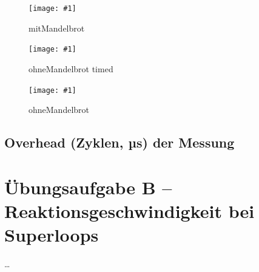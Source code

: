 \documentclass{article}
\newcommand{\bild}[3]{\begin{figure}[h!]		\begin{center}			\texttt{[image: \#1]}			\caption{#2}		\end{center}	\end{figure}}
\begin{document}
\bild{02_mitMandelbrot}{mitMandelbrot}{width=\textwidth}
\bild{03_ohneMandelbrot_time}{ohneMandelbrot timed}{width=\textwidth}
\bild{03_ohneMandelbrot}{ohneMandelbrot}{width=\textwidth}

\subsection{Overhead (Zyklen, µs) der Messung}

\section{Übungsaufgabe B – Reaktionsgeschwindigkeit bei Superloops}
\ldots
\end{document}
